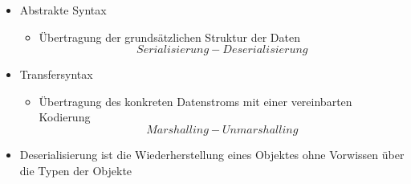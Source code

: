 \begin{itemize}
    \item Abstrakte Syntax
    \begin{itemize}
        \item Übertragung der grundsätzlichen Struktur der Daten \[Serialisierung - Deserialisierung\]
    \end{itemize}
    \item Transfersyntax
    \begin{itemize}
        \item Übertragung des konkreten Datenstroms mit einer vereinbarten Kodierung \[Marshalling - Unmarshalling\]
    \end{itemize}
\end{itemize}

\begin{itemize}
    \item Deserialisierung ist die Wiederherstellung eines Objektes ohne Vorwissen über die Typen der Objekte
\end{itemize}

